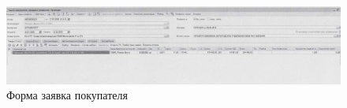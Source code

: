 \begin{figure}
\begin{center}
\includegraphics[height=0.15\textheight, keepaspectratio]{Pics/I.5.5.jpg}
\end{center}
\caption{Форма заявка покупателя}
\label{pic:I.5.5.jpg}
\end{figure}
\clearpage

\clearpage


 
 

%




